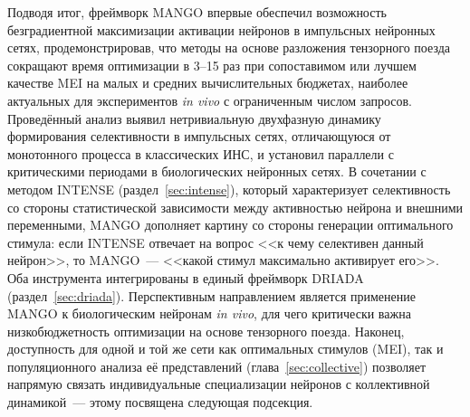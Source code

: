 \medskip

Подводя итог, фреймворк MANGO впервые обеспечил возможность безградиентной максимизации активации нейронов в импульсных нейронных сетях, продемонстрировав, что методы на основе разложения тензорного поезда сокращают время оптимизации в 3--15 раз при сопоставимом или лучшем качестве MEI на малых и средних вычислительных бюджетах, наиболее актуальных для экспериментов \textit{in vivo} с ограниченным числом запросов. Проведённый анализ выявил нетривиальную двухфазную динамику формирования селективности в импульсных сетях, отличающуюся от монотонного процесса в классических ИНС, и установил параллели с критическими периодами в биологических нейронных сетях. В сочетании с методом INTENSE (раздел~\ref{sec:intense}), который характеризует селективность со стороны статистической зависимости между активностью нейрона и внешними переменными, MANGO дополняет картину со стороны генерации оптимального стимула: если INTENSE отвечает на вопрос <<к чему селективен данный нейрон>>, то MANGO~--- <<какой стимул максимально активирует его>>. Оба инструмента интегрированы в единый фреймворк DRIADA (раздел~\ref{sec:driada}). Перспективным направлением является применение MANGO к биологическим нейронам \textit{in vivo}, для чего критически важна низкобюджетность оптимизации на основе тензорного поезда. Наконец, доступность для одной и той же сети как оптимальных стимулов (MEI), так и популяционного анализа её представлений (глава~\ref{sec:collective}) позволяет напрямую связать индивидуальные специализации нейронов с коллективной динамикой~--- этому посвящена следующая подсекция.
